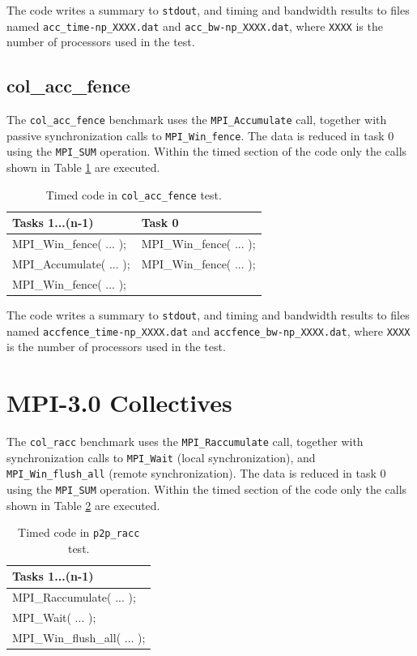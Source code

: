 \documentclass[10pt,a4paper]{report}
\begin{document}
The code writes a summary to \verb+stdout+, and timing and bandwidth results to files named \verb+acc_time-np_XXXX.dat+ and \verb+acc_bw-np_XXXX.dat+, where \verb+XXXX+ is the number of processors used in the test.

\FloatBarrier
\subsection{col\_acc\_fence}
The \verb+col_acc_fence+ benchmark uses the \verb+MPI_Accumulate+ call, together with passive synchronization calls to \verb+MPI_Win_fence+. The data is reduced in task 0 using the \verb+MPI_SUM+ operation. Within the timed section of the code only the calls shown in Table \ref{tab:acc_fence} are executed.

\begin{table}[ht]
\centering
\caption{Timed code in \texttt{col\_acc\_fence} test.}
\label{tab:acc_fence}
\begin{tabular}{|l|l|}
\hline
\bf{Tasks 1...(n-1)}	    & \bf{Task 0}\\\hline
MPI\_Win\_fence( ... ); & MPI\_Win\_fence( ... );\\
MPI\_Accumulate( ... ); & MPI\_Win\_fence( ... );\\
MPI\_Win\_fence( ... ); & \\\hline
\end{tabular}
\end{table}

The code writes a summary to \verb+stdout+, and timing and bandwidth results to files named \verb+accfence_time-np_XXXX.dat+ and \verb+accfence_bw-np_XXXX.dat+, where \verb+XXXX+ is the number of processors used in the test.

\section{MPI-3.0 Collectives}
The \verb+col_racc+ benchmark uses the \verb+MPI_Raccumulate+ call, together with synchronization calls to \verb+MPI_Wait+ (local synchronization), and \verb+MPI_Win_flush_all+ (remote synchronization). The data is reduced in task 0 using the \verb+MPI_SUM+ operation. Within the timed section of the code only the calls shown in Table \ref{tab:racc} are executed.

\begin{table}[ht]
\centering
\caption{Timed code in \texttt{p2p\_racc} test.}
\label{tab:racc}
\begin{tabular}{|l|}
\hline
\bf{Tasks 1...(n-1)}	   \\\hline
MPI\_Raccumulate( ... );           \\
MPI\_Wait( ... );           \\
MPI\_Win\_flush\_all( ... );\\\hline
\end{tabular}
\end{table}
\end{document}
